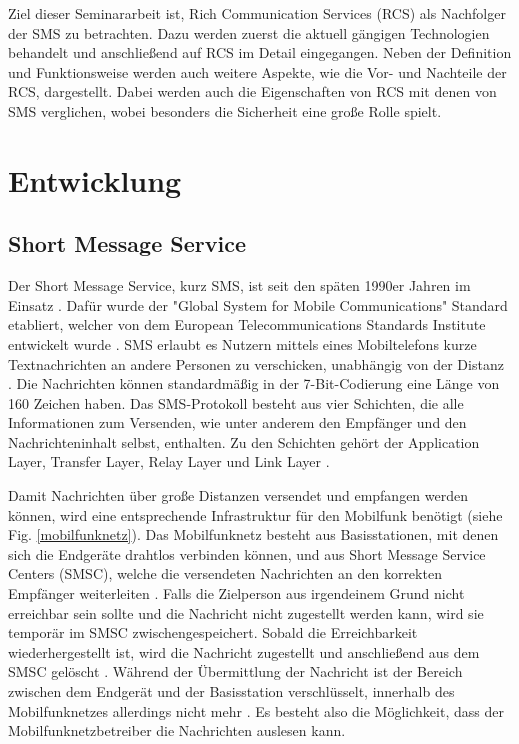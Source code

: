 \documentclass[conference]{IEEEtran}
\begin{document}
Ziel dieser Seminararbeit ist, Rich Communication Services (RCS) als Nachfolger der SMS zu betrachten.
Dazu werden zuerst die aktuell gängigen Technologien behandelt und anschließend auf RCS im Detail eingegangen.
Neben der Definition und Funktionsweise werden auch weitere Aspekte, wie die Vor- und Nachteile der RCS, dargestellt.
Dabei werden auch die Eigenschaften von RCS mit denen von SMS verglichen, wobei besonders die Sicherheit eine große Rolle spielt.

\section{Entwicklung}

\subsection{Short Message Service}

Der Short Message Service, kurz SMS, ist seit den späten 1990er Jahren im Einsatz \cite{sendoutsms}.
Dafür wurde der "Global System for Mobile Communications" Standard etabliert, welcher von dem European Telecommunications Standards Institute entwickelt wurde \cite{smshow}.
SMS erlaubt es Nutzern mittels eines Mobiltelefons kurze Textnachrichten an andere Personen zu verschicken, unabhängig von der Distanz \cite{sendoutsms}.
Die Nachrichten können standardmäßig in der 7-Bit-Codierung eine Länge von 160 Zeichen haben.
Das SMS-Protokoll besteht aus vier Schichten, die alle Informationen zum Versenden, wie unter anderem den Empfänger und den Nachrichteninhalt selbst, enthalten.
Zu den Schichten gehört der Application Layer, Transfer Layer, Relay Layer und Link Layer \cite{smshow}.

Damit Nachrichten über große Distanzen versendet und empfangen werden können, wird eine entsprechende Infrastruktur für den Mobilfunk benötigt (siehe Fig. \ref{mobilfunknetz}).
Das Mobilfunknetz besteht aus Basisstationen, mit denen sich die Endgeräte drahtlos verbinden können, und aus Short Message Service Centers (SMSC), welche die versendeten Nachrichten an den korrekten Empfänger weiterleiten \cite{sendoutsms}.
Falls die Zielperson aus irgendeinem Grund nicht erreichbar sein sollte und die Nachricht nicht zugestellt werden kann, wird sie temporär im SMSC zwischengespeichert. Sobald die Erreichbarkeit wiederhergestellt ist, wird die Nachricht zugestellt und anschließend aus dem SMSC gelöscht \cite{smshow}.
Während der Übermittlung der Nachricht ist der Bereich zwischen dem Endgerät und der Basisstation verschlüsselt, innerhalb des Mobilfunknetzes allerdings nicht mehr \cite{sendoutsms}. Es besteht also die Möglichkeit, dass der Mobilfunknetzbetreiber die Nachrichten auslesen kann.
\end{document}
